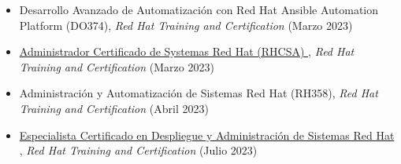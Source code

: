 \documentclass[overlapped,line,final]{../../templates/MichaelDeCorteCV/lib/res}
\begin{document}
\begin{resume}
\begin{itemize}
	\item Desarrollo Avanzado de Automatización con Red Hat Ansible Automation Platform (DO374), \textit{Red Hat Training and Certification} (Marzo 2023) \href{https://raw.githubusercontent.com/dtorot/NemqCV/profile-engineer/latex/docs/Certificate of Attendance (DO374).pdf}{}
	\item \href{https://raw.githubusercontent.com/dtorot/NemqCV/profile-engineer/latex/docs/Red_Hat_Certified_System_Administrator_RHCSA_Badge20230403_28_153keud.pdf}{Administrador Certificado de Systemas Red Hat (RHCSA) }, \textit{Red Hat Training and Certification} (Marzo 2023)
	\item Administración y Automatización de Sistemas Red Hat (RH358), \textit{Red Hat Training and Certification} (Abril 2023) \href{https://raw.githubusercontent.com/dtorot/NemqCV/profile-engineer/latex/docs/Certificate of Attendance (RH358).pdf}{}
	\item \href{https://raw.githubusercontent.com/dtorot/NemqCV/profile-engineer/latex/docs/Red_Hat_Certified_Specialist_in_Deployment_and_Systems_Management.pdf}{Especialista Certificado en Despliegue y Administración de Sistemas Red Hat }, \textit{Red Hat Training and Certification} (Julio 2023) 
\end{itemize} 


\end{resume}
\end{document}
